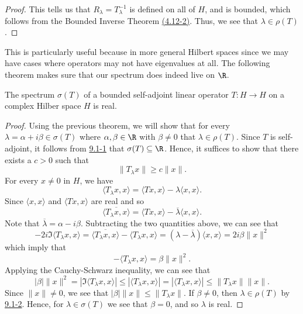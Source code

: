 \begin{proof}
This tells us that \( {R}_{\lambda} = T^{-1}_{\lambda} \) is defined on all of \( H  \), and is bounded, which follows from the \cite{Kreyszig} Bounded Inverse Theorem {\hyperref[4.12-2]{(4.12-2)}}. Thus, we see that \( \lambda \in \rho(T) \).
\end{proof}

This is particularly useful because in more general Hilbert spaces since we may have cases where operators may not have eigenvalues at all. The following theorem makes sure that our spectrum does indeed live on \( \R  \).

\begin{theorem}[Spectrum]
    The spectrum \( \sigma(T) \) of a bounded self-adjoint linear operator \( T: H \to H  \) on a complex Hilber space \( H  \) is real. 
\end{theorem}
\begin{proof}
    Using the previous theorem, we will show that for every \( \lambda = \alpha + i \beta \in \sigma(T)  \) where \( \alpha, \beta \in \R  \) with \( \beta \neq 0  \) that \( \lambda \in \rho(T) \). Since \( T \) is self-adjoint, it follows from {\hyperref[9.1-1]{9.1-1}} that \( \sigma(T) \subseteq \R  \). Hence, it suffices to show that there exists a \( c > 0  \) such that \[  \|{T}_{\lambda}x\| \geq c \|x \|. \tag{*} \] 
    For every \( x \neq 0  \) in \( H  \), we have 
    \[  \langle {T}_{\lambda}x  , x  \rangle = \langle Tx  ,  x  \rangle - \lambda \langle x , x  \rangle. \]
    Since \( \langle x , x \rangle  \) and \( \langle Tx , x  \rangle  \) are real and so 
    \[  \overline{\langle {T}_{\lambda}x  ,  x  \rangle} = \langle Tx  ,  x  \rangle - \overline{\lambda } \langle x , x \rangle.  \]
    Note that \( \overline{\lambda} = \alpha - i \beta  \). Subtracting the two quantities above, we can see that 
    \[ -2i \Im \langle {T}_{\lambda}x  , x  \rangle =  \overline{\langle {T}_{\lambda}x  ,  x  \rangle } - \langle {T}_{\lambda}x  ,  x  \rangle = (\lambda - \overline{\lambda}) \langle x , x \rangle = 2 i \beta \|x\|^{2} \]
    which imply that 
    \[  - \langle {T}_{\lambda}x  ,  x  \rangle = \beta \|x\|^{2}. \]
    Applying the Cauchy-Schwarz inequality, we can see that 
    \[  | \beta | \|x\|^{2} = | \Im \langle {T}_{\lambda}x  ,  x \rangle | \leq | \langle {T}_{\lambda}x  ,  x  \rangle | = | \langle {T}_{\lambda}x  ,  x  \rangle  |  \leq \|{T}_{\lambda}x \| \|x\|. \]
    Since \( \|x \| \neq 0  \), we see that \( | \beta  | \|x \| \leq \|{T}_{\lambda}x \| \). If \( \beta \neq 0  \), then \( \lambda \in \rho(T) \) by {\hyperref[9.1-2]{9.1-2}}. Hence, for \( \lambda \in \sigma(T) \) we see that \( \beta = 0  \), and so \( \lambda  \) is real. 
    
\end{proof}


